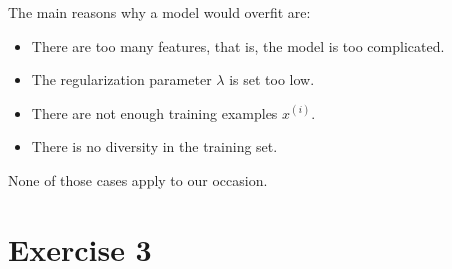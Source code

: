 \documentclass[12pt]{report}
\begin{document}
\begin{itemize}
        The main reasons why a model would overfit are:
        \begin{itemize}
            \item There are too many features, that is, the model is too complicated.
            \item The regularization parameter $\lambda$ is set too low.
            \item There are not enough training examples $x^{(i)}$.
            \item There is no diversity in the training set.
        \end{itemize}
        None of those cases apply to our occasion.
\end{itemize}


\section*{Exercise 3}
\end{document}
